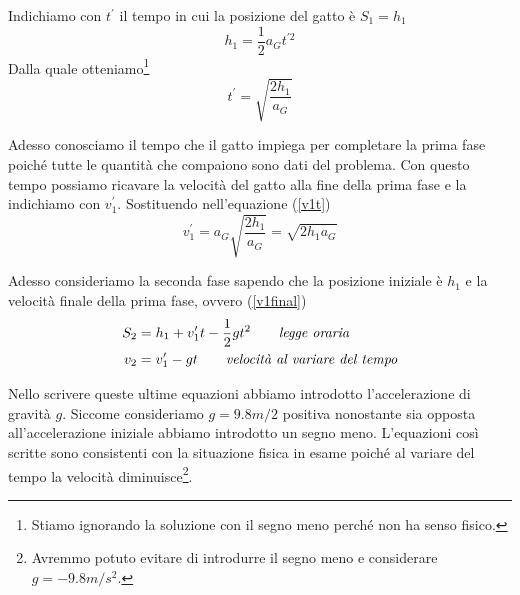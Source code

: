 \documentclass{article}
\begin{document}
Indichiamo con $t^\prime$ il tempo in cui la posizione del gatto è $S_1 = h_1$
\begin{equation}
  h_1 = \frac{1}{2}a_G t^{\prime 2}
\end{equation}
Dalla quale otteniamo\footnote{Stiamo ignorando la soluzione con il segno meno perché non ha senso fisico.}
\begin{equation}
  t^\prime = \sqrt{\frac{2h_1}{a_G}}
\end{equation}

Adesso conosciamo il tempo che il gatto impiega per completare la prima fase poiché tutte le quantità che compaiono sono dati del problema. Con questo tempo possiamo ricavare la velocità del gatto alla fine della prima fase e la indichiamo con $v^\prime_1$. Sostituendo nell'equazione (\ref{v1t})
\begin{equation}\label{v1final}
  v^\prime_1 = a_G \sqrt{\frac{2h_1}{a_G}} = \sqrt{2h_1 a_G}
\end{equation}

Adesso consideriamo la seconda fase sapendo che la posizione iniziale è $h_1$ e la velocità finale della prima fase, ovvero (\ref{v1final})
\begin{align}
  S_2 &= h_1 + v^\prime_1 t - \frac{1}{2}g t^2 \qquad\text{\textit{legge oraria}} \\
  v_2 &=v^\prime_1 - g t \qquad\text{\textit{velocità al variare del tempo}} \label{v2t}
\end{align}

Nello scrivere queste ultime equazioni abbiamo introdotto l'accelerazione di gravità $g$. Siccome consideriamo $g=9.8m/2$ positiva nonostante sia opposta all'accelerazione iniziale abbiamo introdotto un segno meno. L'equazioni così scritte sono consistenti con la situazione fisica in esame poiché al variare del tempo la velocità diminuisce\footnote{Avremmo potuto evitare di introdurre il segno meno e considerare $g=-9.8m/s^2$.}. 
\end{document}
